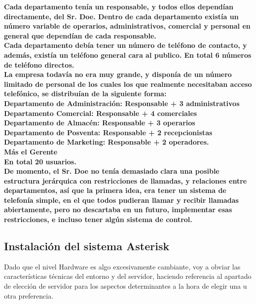 \textbf{Cada departamento tenía un responsable, y todos ellos dependían directamente, del Sr. Doe. Dentro de cada departamento existía un número variable de operarios, administrativos, comercial y personal en general que dependían de cada responsable.}\\

\textbf{Cada departamento debía tener un número de teléfono de contacto, y además, existía un teléfono general cara al publico. En total 6 números de teléfono directos.}\\

\textbf{La empresa todavía no era muy grande, y disponía de un número limitado de personal de los cuales los que realmente necesitaban acceso telefónico, se distribuían de la siguiente forma:}\\

\textbf{Departamento de Administración: Responsable + 3 administrativos}\\
\textbf{Departamento Comercial: Responsable + 4 comerciales}\\
\textbf{Departamento de Almacén: Responsable + 3 operarios}\\
\textbf{Departamento de Posventa: Responsable + 2 recepcionistas}\\
\textbf{Departamento de Marketing: Responsable + 2 operadores.} \\
\textbf{Más el Gerente}\\

\textbf{En total 20 usuarios.}\\

\textbf{De momento, el Sr. Doe no tenía demasiado clara una posible estructura jerárquica con restricciones de llamadas, y relaciones entre departamentos, así que la primera idea, era tener un sistema de telefonía simple, en el que todos pudieran llamar y recibir llamadas abiertamente, pero no descartaba en un futuro, implementar esas restricciones, e incluso tener algún sistema de control.}

\subsection{Instalación del sistema Asterisk}

Dado que el nivel Hardware es algo excesivamente cambiante, voy a obviar las características técnicas del entorno y del servidor, haciendo referencia al apartado de elección de servidor para los aspectos determinantes a la hora de elegir una u otra preferencia.\\

